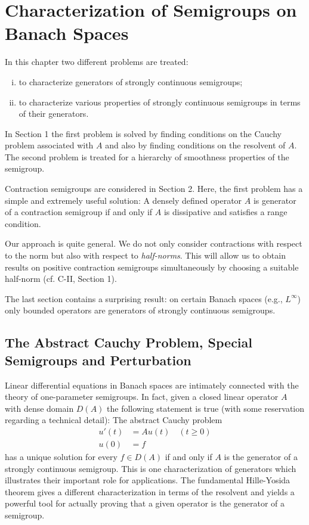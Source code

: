 \chapter{Characterization of Semigroups on Banach Spaces}\label{chap:a2}
In this chapter two different problems are treated:
\begin{enumerate}[(i)]
\item 
to characterize generators of strongly continuous semigroups;
\item 
to characterize various properties of strongly continuous semigroups in terms of their generators.
\end{enumerate}
In Section 1 the first problem is solved by finding conditions on the Cauchy problem associated with $A$ and also by finding conditions on the resolvent of $A$.
The second problem is treated for a hierarchy of smoothness properties of the semigroup.

Contraction semigroups are considered in Section 2.
Here, the first problem has a simple and extremely useful solution: A densely defined operator $A$ is generator of a contraction semigroup if and only if $A$ is dissipative and satisfies a range condition.

Our approach is quite general.
We do not only consider contractions with respect to the norm but also with respect to \emph{half-norms}.
This will allow us to obtain results on positive contraction semigroups simultaneously by choosing a suitable half-norm (cf. C-II, Section 1).

The last section contains a surprising result: on certain Banach spaces (e.g., $L^{\infty}$) only bounded operators are generators of strongly continuous semigroups.
\section{The Abstract Cauchy Problem, Special Semigroups and Perturbation} \label{sec:a2-1}
Linear differential equations in Banach spaces are intimately connected with the theory of one-parameter semigroups.
In fact, given a closed linear operator $A$ with dense domain $D(A)$ the following statement is true (with some reservation regarding a technical detail): The abstract Cauchy problem
\begin{align*}
u'(t) &= Au(t) \quad (t \geq 0) \\
u(0) &= f
\end{align*}
has a unique solution for every $f \in D(A)$ if and only if $A$ is the generator of a strongly continuous semigroup.
This is one characterization of generators which illustrates their important role for applications.
The fundamental Hille-Yosida theorem gives a different characterization in terms of the resolvent and yields a powerful tool for actually proving that a given operator is the generator of a semigroup.

